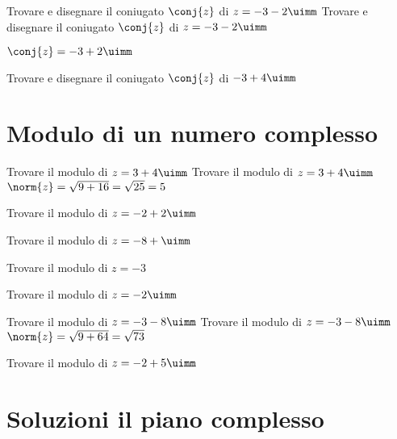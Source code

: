 \begin{exercise}
	Trovare e disegnare il coniugato $\conj{z}$ di $z=-3-2\uimm$
	\tcblower
	Trovare e disegnare il coniugato $\conj{z}$ di $z=-3-2\uimm$
	
	$\conj{z}=-3+2\uimm$
	\begin{center}
		
		\label{fig:disegnopianocomplesso06}
	\end{center}
\end{exercise}
\begin{exercise}[no solution]
	Trovare e disegnare il coniugato $\conj{z}$ di $-3+4\uimm$
\end{exercise}
\section{Modulo di un numero complesso}
\begin{exercise}
	Trovare il modulo di $z=3+4\uimm$
	\tcblower
	Trovare il modulo di $z=3+4\uimm$
	$\norm{z}=\sqrt{9+16}=\sqrt{25}=5$
\end{exercise}
\begin{exercise}[no solution]
	Trovare il modulo di $z=-2+2\uimm$
\end{exercise}
\begin{exercise}[no solution]
	Trovare il modulo di $z=-8+\uimm$
\end{exercise}
\begin{exercise}[no solution]
	Trovare il modulo di $z=-3$
\end{exercise}
\begin{exercise}[no solution]
	Trovare il modulo di $z=-2\uimm$
\end{exercise}
 \begin{exercise}
	Trovare il modulo di $z=-3-8\uimm$
	\tcblower
	Trovare il modulo di $z=-3-8\uimm$
	$\norm{z}=\sqrt{9+64}=\sqrt{73}$
\end{exercise}
\begin{exercise}[no solution]
	Trovare il modulo di $z=-2+5\uimm$
\end{exercise}
 \tcbstoprecording
 \newpage
 \section{Soluzioni il piano complesso}
 \tcbinputrecords
